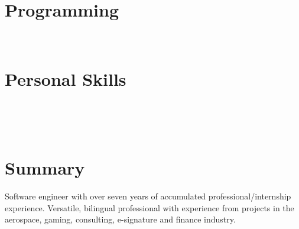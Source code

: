 \documentclass[]{friggeri-cv}
\begin{document}
\begin{aside}
  \section{Programming}
    ~
  \section{Personal Skills}
    ~
\end{aside}
~
\section{Summary}

Software engineer with over seven years of accumulated professional/internship experience. Versatile, bilingual professional with experience from projects in the aerospace, gaming, consulting, e-signature and finance industry.
\end{document}
